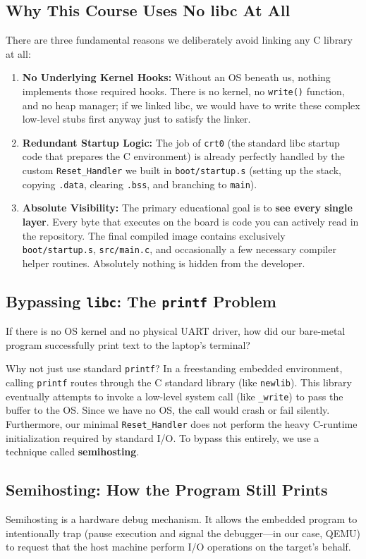 \subsection{Why This Course Uses No libc At All}
There are three fundamental reasons we deliberately avoid linking any C library at all:
\begin{enumerate}
    \item \textbf{No Underlying Kernel Hooks:} Without an OS beneath us, nothing implements those required hooks. There is no kernel, no \texttt{write()} function, and no heap manager; if we linked libc, we would have to write these complex low-level stubs first anyway just to satisfy the linker.
    \item \textbf{Redundant Startup Logic:} The job of \texttt{crt0} (the standard libc startup code that prepares the C environment) is already perfectly handled by the custom \texttt{Reset\_Handler} we built in \texttt{boot/startup.s} (setting up the stack, copying \texttt{.data}, clearing \texttt{.bss}, and branching to \texttt{main}).
    \item \textbf{Absolute Visibility:} The primary educational goal is to \textbf{see every single layer}. Every byte that executes on the board is code you can actively read in the repository. The final compiled image contains exclusively \texttt{boot/startup.s}, \texttt{src/main.c}, and occasionally a few necessary compiler helper routines. Absolutely nothing is hidden from the developer.
\end{enumerate}

\subsection{Bypassing \texttt{libc}: The \texttt{printf} Problem}
If there is no OS kernel and no physical UART driver, how did our bare-metal program successfully print text to the laptop's terminal?

Why not just use standard \texttt{printf}? In a freestanding embedded environment, calling \texttt{printf} routes through the C standard library (like \texttt{newlib}). This library eventually attempts to invoke a low-level system call (like \texttt{\_write}) to pass the buffer to the OS. Since we have no OS, the call would crash or fail silently. Furthermore, our minimal \texttt{Reset\_Handler} does not perform the heavy C-runtime initialization required by standard I/O. To bypass this entirely, we use a technique called \textbf{semihosting}.

\subsection{Semihosting: How the Program Still Prints}
Semihosting is a hardware debug mechanism. It allows the embedded program to intentionally trap (pause execution and signal the debugger—in our case, QEMU) to request that the host machine perform I/O operations on the target's behalf.

